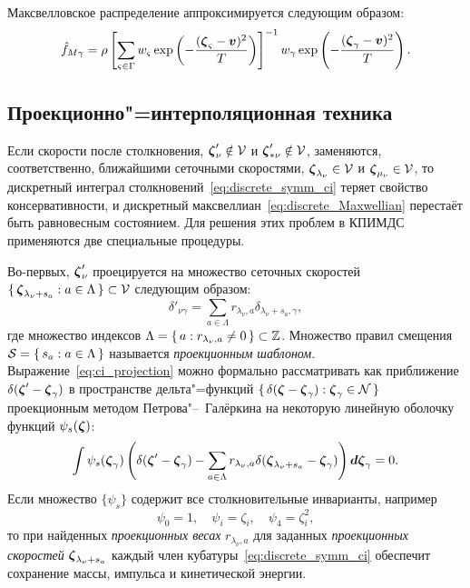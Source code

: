 Максвелловское распределение аппроксимируется следующим образом:
\begin{equation}\label{eq:discrete_Maxwellian}
    \hat{f}_{M\gamma} = \rho\left[\sum_{\varsigma\in\Gamma}w_\varsigma\exp
            \left(-\frac{({\boldsymbol{\zeta}}_\varsigma - \boldsymbol{v})^2}{T}\right)
        \right]^{-1}
        w_\gamma\exp\left(-\frac{({\boldsymbol{\zeta}}_\gamma - \boldsymbol{v})^2}{T}\right).
\end{equation}

\subsection{Проекционно"=интерполяционная техника}

Если скорости после столкновения,
\({\boldsymbol{\zeta}}'_{\nu}\notin\mathcal{V}\) и \({\boldsymbol{\zeta}}'_{*\nu}\notin\mathcal{V}\),
заменяются, соответственно, ближайшими сеточными скоростями,
\({\boldsymbol{\zeta}}_{\lambda_\nu}\in\mathcal{V}\) и \({\boldsymbol{\zeta}}_{\mu_\nu}\in\mathcal{V}\),
то дискретный интеграл столкновений~\eqref{eq:discrete_symm_ci} теряет свойство консервативности,
и дискретный максвеллиан~\eqref{eq:discrete_Maxwellian} перестаёт быть равновесным состоянием.
Для решения этих проблем в КПИМДС применяются две специальные процедуры.

Во-первых, \({\boldsymbol{\zeta}}'_{\nu}\) проецируется на множество сеточных скоростей
\(\{\,{{\boldsymbol{\zeta}}_{\lambda_\nu+s_a}}:{a\in\Lambda}\,\}\subset\mathcal{V}\) следующим образом:
\begin{equation}\label{eq:ci_projection}
    \delta'_{\nu\gamma} = \sum_{a\in\Lambda} r_{\lambda_\nu,a}\delta_{\lambda_\nu+s_a,\gamma},
\end{equation}
где множество индексов \(\Lambda = \{\,{a}:{r_{\lambda_\nu,a}\neq0}\,\}\subset\mathbb{Z}\).
Множество правил смещения \(\mathcal{S} = \{\,{s_a}:{a\in\Lambda}\,\}\)
называется \emph{проекционным шаблоном}.
Выражение~\eqref{eq:ci_projection} можно формально рассматривать как приближение
\(\delta({\boldsymbol{\zeta}}'-{\boldsymbol{\zeta}}_\gamma)\) в пространстве дельта"=функций
\(\{\,{\delta({\boldsymbol{\zeta}}-{\boldsymbol{\zeta}}_\gamma)}:{{\boldsymbol{\zeta}}_\gamma\in\mathcal{N}}\,\}\)
проекционным методом Петрова"--~Галёркина на некоторую линейную оболочку функций \(\psi_s({\boldsymbol{\zeta}})\):
\begin{equation}\label{eq:Petrov-Galerkin}
    \int \psi_s({\boldsymbol{\zeta}}_\gamma) \left( \delta({\boldsymbol{\zeta}}'-{\boldsymbol{\zeta}}_\gamma)
        - \sum_{a\in\Lambda} r_{\lambda_\nu,a} \delta({\boldsymbol{\zeta}}_{\lambda_\nu+s_a}-{\boldsymbol{\zeta}}_\gamma) \right) \boldsymbol{d\zeta}_\gamma = 0.
\end{equation}
Если множество \(\{\psi_s\}\) содержит все столкновительные инварианты, например
\begin{equation}\label{eq:collision_invariants}
    \psi_0 = 1, \quad \psi_i = \zeta_i, \quad \psi_4 = \zeta_i^2,
\end{equation}
то при найденных \emph{проекционных весах} \(r_{\lambda_\nu,a}\)
для заданных \emph{проекционных скоростей} \({\boldsymbol{\zeta}}_{\lambda_\nu+s_a}\)
каждый член кубатуры~\eqref{eq:discrete_symm_ci} обеспечит сохранение массы, импульса и кинетической энергии.


